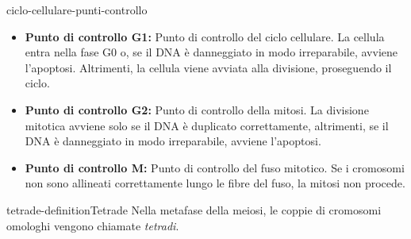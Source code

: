 \documentclass[preview]{standalone}
\begin{document}
\begin{snippet}{ciclo-cellulare-punti-controllo}
    \begin{itemize}
        \item \textbf{Punto di controllo G1:}
            Punto di controllo del ciclo cellulare. La cellula entra nella fase G0 o, se il DNA è danneggiato
            in modo irreparabile, avviene l'apoptosi. Altrimenti, la cellula viene avviata alla divisione,
            proseguendo il ciclo.
        \item \textbf{Punto di controllo G2:}
            Punto di controllo della mitosi. La divisione mitotica avviene solo se il DNA è duplicato
            correttamente, altrimenti, se il DNA è danneggiato in modo irreparabile, avviene l'apoptosi.
        \item \textbf{Punto di controllo M:}
            Punto di controllo del fuso mitotico. Se i cromosomi non sono allineati correttamente lungo
            le fibre del fuso, la mitosi non procede.
    \end{itemize}
\end{snippet}

\begin{snippetdefinition}{tetrade-definition}{Tetrade}
    Nella metafase della meiosi, le coppie di cromosomi omologhi vengono chiamate
    \textit{tetradi}.
\end{snippetdefinition}


\end{document}
